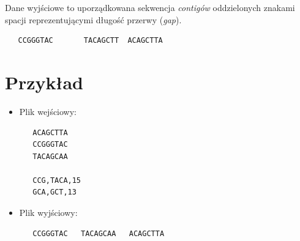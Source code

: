 \documentclass[a4paper,10pt]{article}
\begin{document}
Dane wyjściowe to uporządkowana sekwencja \emph{contigów} oddzielonych znakami spacji reprezentującymi długość przerwy (\emph{gap}).

  \begin{verbatim}
   CCGGGTAC       TACAGCTT  ACAGCTTA
  \end{verbatim}

\section*{Przykład}

\begin{itemize}
 \item Plik wejściowy:
  \begin{verbatim}
   ACAGCTTA
   CCGGGTAC
   TACAGCAA

   CCG,TACA,15
   GCA,GCT,13
  \end{verbatim}
 \item Plik wyjściowy:
  \begin{verbatim}
   CCGGGTAC   TACAGCAA   ACAGCTTA
  \end{verbatim}
\end{itemize}
\end{document}
